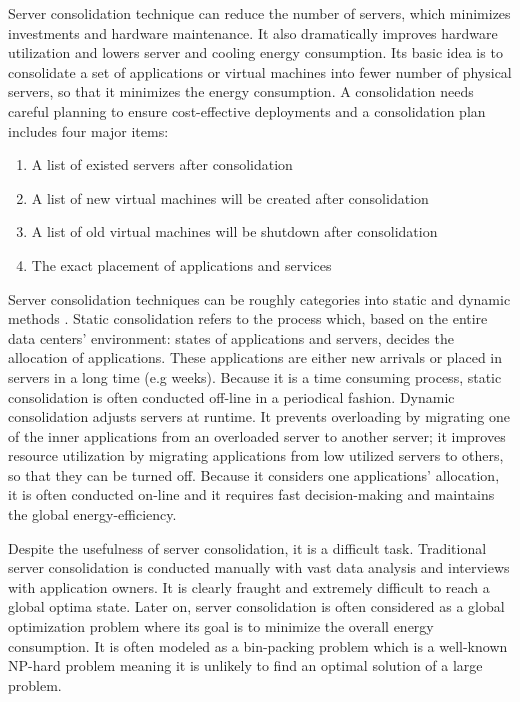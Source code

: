Server consolidation technique \cite{Zhang:2010vo} can reduce the number of servers, which minimizes investments and hardware maintenance. It also dramatically improves hardware utilization and lowers server and cooling energy consumption. Its basic idea is to consolidate a set of applications or virtual machines into fewer number of 
physical servers, so that it minimizes the energy consumption.
A consolidation needs careful planning to ensure cost-effective deployments and a consolidation plan includes four major items:
			\begin{enumerate}
				\item A list of existed servers after consolidation
				\item A list of new virtual machines will be created after consolidation
				\item A list of old virtual machines will be shutdown after consolidation
				\item The exact placement of applications and services
			\end{enumerate}
Server consolidation techniques can be roughly categories into static and dynamic methods \cite{Xiao:2015ik, Verma:2009wi}. Static consolidation refers to the process which, based on the entire data centers' environment: states of applications and servers, decides the allocation of applications. These applications are either new arrivals or placed in servers in a long time (e.g weeks). Because it is a time consuming process, static consolidation is often conducted off-line in a periodical fashion. Dynamic consolidation adjusts servers at runtime. It prevents overloading by migrating one of the inner applications from an overloaded server to another server; it improves resource utilization by migrating applications from low utilized servers to others, so that they can be turned off. Because it considers one applications' allocation, it is often conducted on-line and it requires fast decision-making and maintains the global energy-efficiency.

\vspace{10mm}

Despite the usefulness of server consolidation, it is a difficult task. Traditional server consolidation is conducted manually with vast data analysis and interviews with application owners. It is clearly fraught and extremely difficult to reach a global optima state.
Later on, server consolidation is often considered as a global optimization problem 
where its goal is to minimize the overall energy consumption. 
It is often modeled as a bin-packing problem \cite{Mann:2015ua} which is a well-known NP-hard problem meaning it is unlikely to find an optimal solution of a large problem. 

